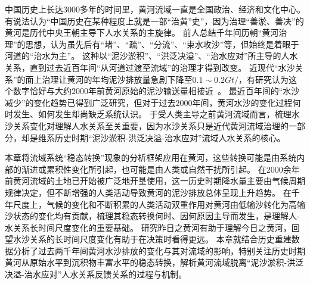 

中国历史上长达3000多年的时间里，黄河流域一直是全国政治、经济和文化中心。
有说法认为“中国历史在某种程度上就是一部“治黄”史”，因为治理“善淤、善决”的黄河是历代中央王朝主导下人水关系的主旋律。
前人总结千年间历朝“黄河治理”的思想，认为虽先后有“堵”、“疏”、“分流”、“束水攻沙”等，但始终是着眼于河道的“治水为主”\cite{WangWeiJing2009}。
这种以“泥沙淤积”、“洪泛决溢”、“治水应对”所主导的人水关系，直到过去近百年间“从河道过渡至流域”的治理才得到改变。
近现代“水沙关系”的面上治理让黄河的年均泥沙排放量急剧下降至$0.1\sim0.2 Gt/$，有研究认为这个数字恰好与大约$2000$年前黄河原始的泥沙输送量相接近~\cite{wang2007}。
最近百年间的“水沙减少”的变化趋势已得到广泛研究\cite{wei2016, song2020, wang2016a}，但对于过去$2000$年间，黄河水沙的变化过程何时发生、如何发生却尚缺乏系统认识。
于受人类主导之前黄河流域而言，梳理水沙关系变化对理解人水关系至关重要，因为水沙关系只是近代黄河流域治理的一部分，却是维系历史时期“泥沙淤积-洪泛决溢-治水应对”流域人水关系的核心。

本章将流域系统“稳态转换”现象的分析框架应用在黄河，这些转换可能是由系统内部的渐进或累积性变化所引起，也可能是由人类或自然干扰所引起。
在$2000$余年前黄河流域的土地已开始被广泛地开垦使用，这一历史时期降水量主要由气候周期规律决定，但不断增强的人类活动导致黄河的泥沙排放总体呈现上升趋势\cite{wang2007}。
在千年尺度上，气候的变化和不断积累的人类活动双重作用对黄河由低输沙转化为高输沙状态的变化均有贡献，梳理其稳态转换何时、因何原因主导而发生，是理解人-水关系长时间尺度变化的重要基础。
研究昨日之黄河有助于理解今日之黄河，回望水沙关系的长时间尺度变化有助于在决策时看得更远。
本章就结合历史重建数据分析了过去两千年间黄河水沙排放的变化与其对流域的影响，特别关注历史时期黄河从原始水平到沉积物丰富水平的稳态转换，解析黄河流域脱离“泥沙淤积-洪泛决溢-治水应对”人水关系反馈关系的过程与机制。


